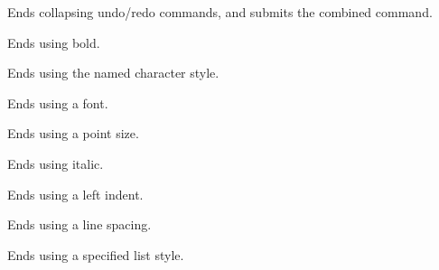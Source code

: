 \label{wxrichtextbufferendbatchundo}


Ends collapsing undo/redo commands, and submits the combined command.

\label{wxrichtextbufferendbold}


Ends using bold.

\label{wxrichtextbufferendcharacterstyle}


Ends using the named character style.

\label{wxrichtextbufferendfont}


Ends using a font.

\label{wxrichtextbufferendfontsize}


Ends using a point size.

\label{wxrichtextbufferenditalic}


Ends using italic.

\label{wxrichtextbufferendleftindent}


Ends using a left indent.

\label{wxrichtextbufferendlinespacing}


Ends using a line spacing.

\label{wxrichtextbufferendliststyle}


Ends using a specified list style.

\label{wxrichtextbufferendnumberedbullet}


